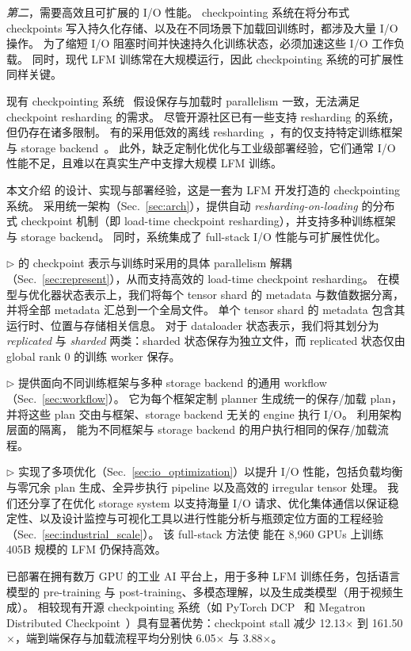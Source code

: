 \textit{第二}，需要高效且可扩展的 I/O 性能。
checkpointing 系统在将分布式 checkpoints 写入持久化存储、以及在不同场景下加载回训练时，都涉及大量 I/O 操作。
为了缩短 I/O 阻塞时间并快速持久化训练状态，必须加速这些 I/O 工作负载。
同时，现代 LFM 训练常在大规模运行，因此 checkpointing 系统的可扩展性同样关键。

现有 checkpointing 系统~\cite{checkfreq, check-n-run, gemini-sys, jit-check} 假设保存与加载时 parallelism 一致，无法满足 checkpoint resharding 的需求。
尽管开源社区已有一些支持 resharding 的系统，但仍存在诸多限制。
有的采用低效的离线 resharding~\cite{deepspeed-ucp}，有的仅支持特定训练框架与 storage backend~\cite{torch-dcp, megatron-dcp}。
此外，缺乏定制化优化与工业级部署经验，它们通常 I/O 性能不足，且难以在真实生产中支撑大规模 LFM 训练。

本文介绍 \sys{} 的设计、实现与部署经验，这是一套为 LFM 开发打造的 checkpointing 系统。
\sys{} 采用统一架构（Sec.~\ref{sec:arch}），提供自动 \textit{resharding-on-loading} 的分布式 checkpoint 机制（即 load-time checkpoint resharding），并支持多种训练框架与 storage backend。
同时，系统集成了 full-stack I/O 性能与可扩展性优化。

$\triangleright$ \sys{} 的 checkpoint 表示与训练时采用的具体 parallelism 解耦（Sec.~\ref{sec:represent}），从而支持高效的 load-time checkpoint resharding。
在模型与优化器状态表示上，我们将每个 tensor shard 的 metadata 与数值数据分离，并将全部 metadata 汇总到一个全局文件。
单个 tensor shard 的 metadata 包含其运行时、位置与存储相关信息。
对于 dataloader 状态表示，我们将其划分为 \textit{replicated} 与 \textit{sharded} 两类：sharded 状态保存为独立文件，而 replicated 状态仅由 global rank 0 的训练 worker 保存。

$\triangleright$ \sys{} 提供面向不同训练框架与多种 storage backend 的通用 workflow（Sec.~\ref{sec:workflow}）。
它为每个框架定制 planner 生成统一的保存/加载 plan，并将这些 plan 交由与框架、storage backend 无关的 engine 执行 I/O。
利用架构层面的隔离，\sys{} 能为不同框架与 storage backend 的用户执行相同的保存/加载流程。

$\triangleright$ \sys{} 实现了多项优化（Sec.~\ref{sec:io_optimization}）以提升 I/O 性能，包括负载均衡与零冗余 plan 生成、全异步执行 pipeline 以及高效的 irregular tensor 处理。
我们还分享了在优化 storage system 以支持海量 I/O 请求、优化集体通信以保证稳定性、以及设计监控与可视化工具以进行性能分析与瓶颈定位方面的工程经验（Sec.~\ref{sec:industrial_scale}）。
该 full-stack 方法使 \sys{} 能在 8,960 GPUs 上训练 405B 规模的 LFM 仍保持高效。

\sys{} 已部署在拥有数万 GPU 的工业 AI 平台上，用于多种 LFM 训练任务，包括语言模型的 pre-training 与 post-training、多模态理解，以及生成类模型（\eg 用于视频生成）。
\sys{} 相较现有开源 checkpointing 系统（如 PyTorch DCP~\cite{torch-dcp} 和 Megatron Distributed Checkpoint~\cite{megatron-dcp}）具有显著优势：checkpoint stall 减少 12.13$\times$ 到 161.50$\times$，端到端保存与加载流程平均分别快 6.05$\times$ 与 3.88$\times$。

